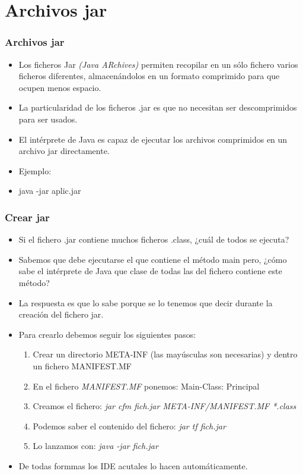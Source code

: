 \documentclass{beamer}
\begin{document}
\section{Archivos jar}
\begin{frame}
\frametitle{Archivos jar}
\begin{itemize}[<+->]
\item Los ficheros Jar \emph{(Java ARchives)} permiten recopilar en un sólo fichero varios ficheros diferentes, almacenándolos en un formato comprimido para que ocupen menos espacio.
\item La particularidad de los ficheros .jar es que no necesitan ser descomprimidos para ser usados.
\item El intérprete de Java es capaz de ejecutar los archivos comprimidos en un archivo jar directamente. 
\item Ejemplo:
\item \alert{java -jar aplic.jar}
\end{itemize}
\pause
\end{frame}

\begin{frame}
\frametitle{Crear jar}
\begin{itemize}[<+->]
\item Si el fichero .jar contiene muchos ficheros .class, ¿cuál de todos se ejecuta?
\item Sabemos que debe ejecutarse el que contiene el método main pero, ¿cómo sabe el intérprete de Java que clase de todas las del fichero contiene este método?
\item La respuesta es que lo sabe porque se lo tenemos que decir durante la creación del fichero jar.  
\item Para crearlo debemos seguir los siguientes pasos:
\begin{enumerate}
\item Crear un directorio META-INF (las mayúsculas son necesarias) y dentro un fichero MANIFEST.MF
\item En el fichero \emph{MANIFEST.MF} ponemos: Main-Class: Principal
\item Creamos el fichero: \alert{\emph{jar cfm fich.jar META-INF/MANIFEST.MF *.class}}
\item Podemos saber el contenido del fichero: \alert{\emph{jar tf fich.jar}}
\item Lo lanzamos con: \alert{\emph{java -jar fich.jar }}
\end{enumerate}
\item De todas formmas los IDE acutales lo hacen automáticamente.
\end{itemize}
\pause
\end{frame}
\end{document}

